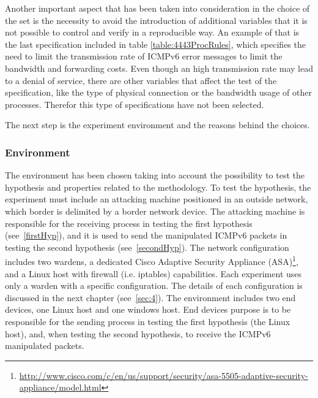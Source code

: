 \documentclass[12pt]{article}
\begin{document}
Another important aspect that has been taken into consideration in the choice of the set is the necessity to avoid the introduction of additional variables that it is not possible to control and verify in a reproducible way. An example of that is the last specification included in table \ref{table:4443ProcRules}, which specifies the need to limit the transmission rate of ICMPv6 error messages to limit the bandwidth and forwarding costs. Even though an high transmission rate may lead to a denial of service, there are other variables that affect the test of the specification, like the type of physical connection or the bandwidth usage of other processes. Therefor this type of specifications have not been selected.

The next step is the experiment environment and the reasons behind the choices.

\subsubsection{Environment}
\label{subsub:enviroment}

The environment has been chosen taking into account the possibility to test the hypothesis and properties related to the methodology. To test the hypothesis, the experiment must include an attacking machine positioned in an outside network, which border is delimited by a border network device. The attacking machine is responsible for the receiving process in testing the first hypothesis (see~\ref{firstHyp}), and it is used to send the manipulated ICMPv6 packets in testing the second hypothesis (see~\ref{secondHyp}). The network configuration includes two wardens, a dedicated Cisco Adaptive Security Appliance (ASA)\footnote{\url{http://www.cisco.com/c/en/us/support/security/asa-5505-adaptive-security-appliance/model.html}}, and a Linux host with firewall (i.e. iptables) capabilities. Each experiment uses only a warden with a specific configuration. The details of each configuration is discussed in the next chapter (see~\ref{sec:4}). The environment includes two end devices, one Linux host and one windows host. End devices purpose is to be responsible for the sending process in testing the first hypothesis (the Linux host), and, when testing the second hypothesis, to receive the ICMPv6 manipulated packets.
\end{document}
